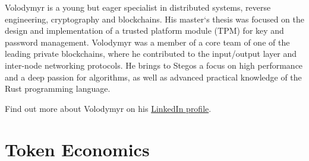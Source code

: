\documentclass[8pt,fleqn,openany]{book}
\begin{document}
{{			Volodymyr is a young but eager specialist in distributed systems, reverse engineering, cryptography and blockchains. His master`s thesis was focused on the design and implementation of a trusted platform module (TPM) for key and password management. Volodymyr was a member of a core team of one of the leading private blockchains, where he contributed to the input/output layer and inter-node networking protocols. He brings to Stegos a focus on high performance and a deep passion for algorithms, as well as advanced practical knowledge of the Rust programming language.
			
			Find out more about Volodymyr on his \href{https://linkedin.com/in/vldm}{LinkedIn profile}.
		}
		
		\chapter{Token Economics}\label{app:token-economics}
		
}
\end{document}
